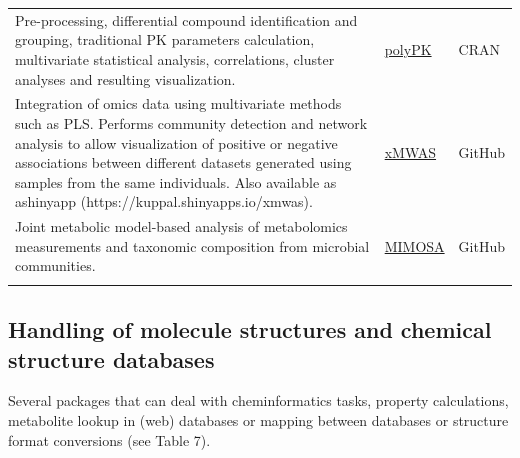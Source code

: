 \documentclass[]{article}
\begin{document}
\begin{longtable}{>{\raggedright\arraybackslash}p{30em}>{\raggedright\arraybackslash}p{10em}>{\raggedright\arraybackslash}p{3em}}
\rowcolor{gray!6}  Pre-processing, differential compound identification and grouping, traditional PK parameters calculation, multivariate statistical analysis, correlations, cluster analyses and resulting visualization. & \href{https://cran.r-project.org/package=polyPK}{polyPK} & CRAN\\
Integration of omics data using multivariate methods such as PLS. Performs community detection and network analysis to allow visualization of positive or negative associations between different datasets generated using samples from the same individuals. Also available as ashinyapp (https://kuppal.shinyapps.io/xmwas). & \href{https://github.com/kuppal2/xMWAS}{xMWAS} & GitHub\\
\rowcolor{gray!6}  Joint metabolic model-based analysis of metabolomics measurements and taxonomic composition from microbial communities. & \href{https://github.com/borenstein-lab/MIMOSA/tree/master/mimosa}{MIMOSA} & GitHub\\*
\end{longtable}

\newpage

\hypertarget{handling-of-molecule-structures-and-chemical-structure-databases}{%
\subsection{Handling of molecule structures and chemical structure databases}\label{handling-of-molecule-structures-and-chemical-structure-databases}}

Several packages that can deal with cheminformatics tasks, property calculations, metabolite lookup in (web) databases or mapping between databases or structure format conversions (see Table 7).
\end{document}
